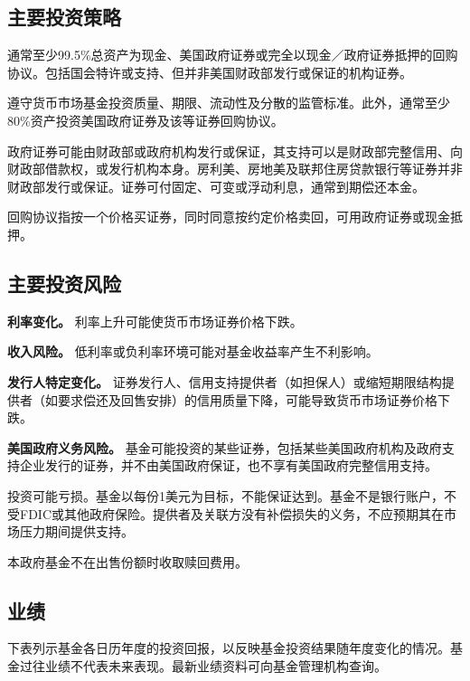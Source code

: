 \documentclass[UTF8,fontset=none,11pt,a4paper]{ctexart}
\begin{document}
\subsection*{主要投资策略}
通常至少99.5\%总资产为现金、美国政府证券或完全以现金／政府证券抵押的回购协议。包括国会特许或支持、但并非美国财政部发行或保证的机构证券。


遵守货币市场基金投资质量、期限、流动性及分散的监管标准。此外，通常至少80\%资产投资美国政府证券及该等证券回购协议。


政府证券可能由财政部或政府机构发行或保证，其支持可以是财政部完整信用、向财政部借款权，或发行机构本身。房利美、房地美及联邦住房贷款银行等证券并非财政部发行或保证。证券可付固定、可变或浮动利息，通常到期偿还本金。


回购协议指按一个价格买证券，同时同意按约定价格卖回，可用政府证券或现金抵押。


\subsection*{主要投资风险}
\textbf{利率变化。} 利率上升可能使货币市场证券价格下跌。


\textbf{收入风险。} 低利率或负利率环境可能对基金收益率产生不利影响。


\textbf{发行人特定变化。} 证券发行人、信用支持提供者（如担保人）或缩短期限结构提供者（如要求偿还及回售安排）的信用质量下降，可能导致货币市场证券价格下跌。


\textbf{美国政府义务风险。} 基金可能投资的某些证券，包括某些美国政府机构及政府支持企业发行的证券，并不由美国政府保证，也不享有美国政府完整信用支持。


投资可能亏损。基金以每份1美元为目标，不能保证达到。基金不是银行账户，不受FDIC或其他政府保险。提供者及关联方没有补偿损失的义务，不应预期其在市场压力期间提供支持。


本政府基金不在出售份额时收取赎回费用。


\subsection*{业绩}
下表列示基金各日历年度的投资回报，以反映基金投资结果随年度变化的情况。基金过往业绩不代表未来表现。最新业绩资料可向基金管理机构查询。
\end{document}
